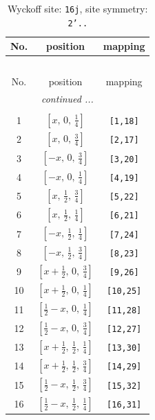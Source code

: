 \documentclass[fleqn,8pt]{jsarticle}
\begin{document}
\renewcommand{\arraystretch}{1.2}
\begin{longtable}{ccc}
\caption{Wyckoff site: {\tt 16j}, site symmetry: {\tt 2'..}}
 \\
 \hline \hline
No. & position & mapping \\ \hline \endfirsthead

\multicolumn{2}{l}{\tablename\ \thetable{}} \\
 \hline \hline
No. & position & mapping \\ \hline \endhead

 \hline \hline
\multicolumn{2}{r}{\footnotesize\it continued ...} \\ \endfoot

 \hline \hline
\multicolumn{2}{r}{} \\ \endlastfoot

1 & $\left[ x,\, 0,\, \frac{1}{4} \right]$ & {\tt [1,18]} \\ \hline
2 & $\left[ x,\, 0,\, \frac{3}{4} \right]$ & {\tt [2,17]} \\ \hline
3 & $\left[ - x,\, 0,\, \frac{3}{4} \right]$ & {\tt [3,20]} \\ \hline
4 & $\left[ - x,\, 0,\, \frac{1}{4} \right]$ & {\tt [4,19]} \\ \hline
5 & $\left[ x,\, \frac{1}{2},\, \frac{3}{4} \right]$ & {\tt [5,22]} \\ \hline
6 & $\left[ x,\, \frac{1}{2},\, \frac{1}{4} \right]$ & {\tt [6,21]} \\ \hline
7 & $\left[ - x,\, \frac{1}{2},\, \frac{1}{4} \right]$ & {\tt [7,24]} \\ \hline
8 & $\left[ - x,\, \frac{1}{2},\, \frac{3}{4} \right]$ & {\tt [8,23]} \\ \hline
9 & $\left[ x + \frac{1}{2},\, 0,\, \frac{3}{4} \right]$ & {\tt [9,26]} \\ \hline
10 & $\left[ x + \frac{1}{2},\, 0,\, \frac{1}{4} \right]$ & {\tt [10,25]} \\ \hline
11 & $\left[ \frac{1}{2} - x,\, 0,\, \frac{1}{4} \right]$ & {\tt [11,28]} \\ \hline
12 & $\left[ \frac{1}{2} - x,\, 0,\, \frac{3}{4} \right]$ & {\tt [12,27]} \\ \hline
13 & $\left[ x + \frac{1}{2},\, \frac{1}{2},\, \frac{1}{4} \right]$ & {\tt [13,30]} \\ \hline
14 & $\left[ x + \frac{1}{2},\, \frac{1}{2},\, \frac{3}{4} \right]$ & {\tt [14,29]} \\ \hline
15 & $\left[ \frac{1}{2} - x,\, \frac{1}{2},\, \frac{3}{4} \right]$ & {\tt [15,32]} \\ \hline
16 & $\left[ \frac{1}{2} - x,\, \frac{1}{2},\, \frac{1}{4} \right]$ & {\tt [16,31]} \\
\end{longtable}
\end{document}
